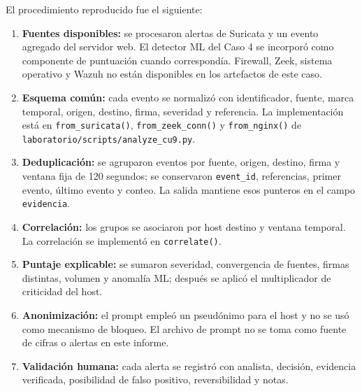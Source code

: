El procedimiento reproducido fue el siguiente:

\begin{enumerate}
\item \textbf{Fuentes disponibles:} se procesaron alertas de Suricata y un evento agregado del servidor web. El detector ML del Caso 4 se incorporó como componente de puntuación cuando correspondía. Firewall, Zeek, sistema operativo y Wazuh no están disponibles en los artefactos de este caso.
\item \textbf{Esquema común:} cada evento se normalizó con identificador, fuente, marca temporal, origen, destino, firma, severidad y referencia. La implementación está en \texttt{from\_suricata()}, \texttt{from\_zeek\_conn()} y \texttt{from\_nginx()} de \texttt{laboratorio/scripts/analyze\_cu9.py}.
\item \textbf{Deduplicación:} se agruparon eventos por fuente, origen, destino, firma y ventana fija de 120 segundos; se conservaron \texttt{event\_id}, referencias, primer evento, último evento y conteo. La salida mantiene esos punteros en el campo \texttt{evidencia}.
\item \textbf{Correlación:} los grupos se asociaron por host destino y ventana temporal. La correlación se implementó en \texttt{correlate()}.
\item \textbf{Puntaje explicable:} se sumaron severidad, convergencia de fuentes, firmas distintas, volumen y anomalía ML; después se aplicó el multiplicador de criticidad del host.
\item \textbf{Anonimización:} el prompt empleó un pseudónimo para el host y no se usó como mecanismo de bloqueo. El archivo de prompt no se toma como fuente de cifras o alertas en este informe.
\item \textbf{Validación humana:} cada alerta se registró con analista, decisión, evidencia verificada, posibilidad de falso positivo, reversibilidad y notas.
\end{enumerate}

